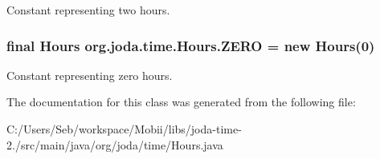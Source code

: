 Constant representing two hours. \hypertarget{classorg_1_1joda_1_1time_1_1_hours_a5b3c4f4ae9168d096bac10cc309354d4}{
\subsubsection[{Z\-E\-R\-O}]{\setlength{\rightskip}{0pt plus 5cm}final {\bf Hours} org.\-joda.\-time.\-Hours.\-Z\-E\-R\-O = new {\bf Hours}(0)\hspace{0.3cm}{\ttfamily [static]}}}\label{classorg_1_1joda_1_1time_1_1_hours_a5b3c4f4ae9168d096bac10cc309354d4}
Constant representing zero hours. 

The documentation for this class was generated from the following file\-:\begin{DoxyCompactItemize}
\item 
C\-:/\-Users/\-Seb/workspace/\-Mobii/libs/joda-\/time-\/2./src/main/java/org/joda/time/Hours.\-java\end{DoxyCompactItemize}
